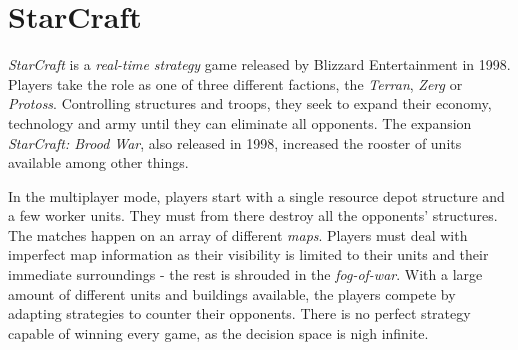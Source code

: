 \chapter{StarCraft}
\emph{StarCraft} is a \emph{real-time strategy} game released by Blizzard Entertainment in 1998. Players take the role as one of three different factions, the \emph{Terran}, \emph{Zerg} or \emph{Protoss}. Controlling structures and troops, they seek to expand their economy, technology and army until they can eliminate all opponents. The expansion \emph{StarCraft: Brood War}, also released in 1998, increased the rooster of units available among other things.

In the multiplayer mode, players start with a single resource depot structure and a few worker units. They must from there destroy all the opponents' structures. The matches happen on an array of different \emph{maps}. Players must deal with imperfect map information as their visibility is limited to their units and their immediate surroundings - the rest is shrouded in the \emph{fog-of-war}. With a large amount of different units and buildings available, the players compete by adapting strategies to counter their opponents. There is no perfect strategy capable of winning every game, as the decision space is nigh infinite.
